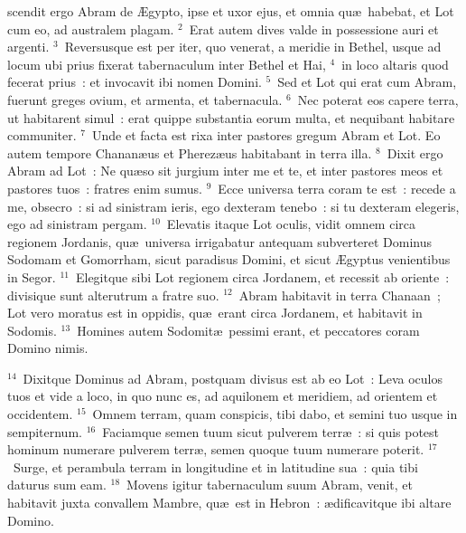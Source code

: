 \bchapter
{}scendit ergo Abram de \AE gypto, ipse et uxor ejus, et omnia qu\ae\ habebat, et Lot cum eo, ad australem plagam.
${}^{2}$~Erat autem dives valde in possessione auri et argenti.
${}^{3}$~Reversusque est per iter, quo venerat, a meridie in Bethel, usque ad locum ubi prius fixerat tabernaculum inter Bethel et Hai,
${}^{4}$~in loco altaris quod fecerat prius~: et invocavit ibi nomen Domini.
${}^{5}$~Sed et Lot qui erat cum Abram, fuerunt greges ovium, et armenta, et tabernacula.
${}^{6}$~Nec poterat eos capere terra, ut habitarent simul~: erat quippe substantia eorum multa, et nequibant habitare communiter.
${}^{7}$~Unde et facta est rixa inter pastores gregum Abram et Lot. Eo autem tempore Chanan\ae us et Pherez\ae us habitabant in terra illa.
${}^{8}$~Dixit ergo Abram ad Lot~: Ne qu\ae so sit jurgium inter me et te, et inter pastores meos et pastores tuos~: fratres enim sumus.
${}^{9}$~Ecce universa terra coram te est~: recede a me, obsecro~: si ad sinistram ieris, ego dexteram tenebo~: si tu dexteram elegeris, ego ad sinistram pergam.
${}^{10}$~Elevatis itaque Lot oculis, vidit omnem circa regionem Jordanis, qu\ae\ universa irrigabatur antequam subverteret Dominus Sodomam et Gomorrham, sicut paradisus Domini, et sicut \AE gyptus venientibus in Segor.
${}^{11}$~Elegitque sibi Lot regionem circa Jordanem, et recessit ab oriente~: divisique sunt alterutrum a fratre suo.
${}^{12}$~Abram habitavit in terra Chanaan~; Lot vero moratus est in oppidis, qu\ae\ erant circa Jordanem, et habitavit in Sodomis.
${}^{13}$~Homines autem Sodomit\ae\ pessimi erant, et peccatores coram Domino nimis.


${}^{14}$~Dixitque Dominus ad Abram, postquam divisus est ab eo Lot~: Leva oculos tuos et vide a loco, in quo nunc es, ad aquilonem et meridiem, ad orientem et occidentem.
${}^{15}$~Omnem terram, quam conspicis, tibi dabo, et semini tuo usque in sempiternum.
${}^{16}$~Faciamque semen tuum sicut pulverem terr\ae~: si quis potest hominum numerare pulverem terr\ae , semen quoque tuum numerare poterit.
${}^{17}$~Surge, et perambula terram in longitudine et in latitudine sua~: quia tibi daturus sum eam.
${}^{18}$~Movens igitur tabernaculum suum Abram, venit, et habitavit juxta convallem Mambre, qu\ae\ est in Hebron~: \ae dificavitque ibi altare Domino.

